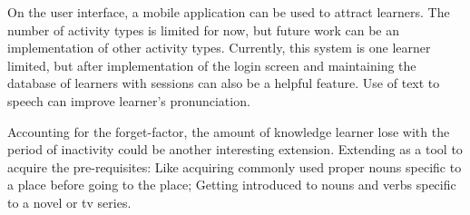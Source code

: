 \documentclass[11pt,a4paper]{article}
\begin{document}
On the user interface, a mobile application can be used to attract learners. The number of activity types is limited for now, but future work can be an implementation of other activity types. Currently, this system is one learner limited, but after implementation of the login screen and maintaining the database of learners with sessions can also be a helpful feature. Use of text to speech can improve learner's pronunciation. 

Accounting for the forget-factor, the amount of knowledge learner lose with the period of inactivity could be another interesting extension.  Extending as a tool to acquire the pre-requisites: Like acquiring commonly used proper nouns specific to a place before going to the place; Getting introduced to nouns and verbs specific to a novel or tv series.




\end{document}
